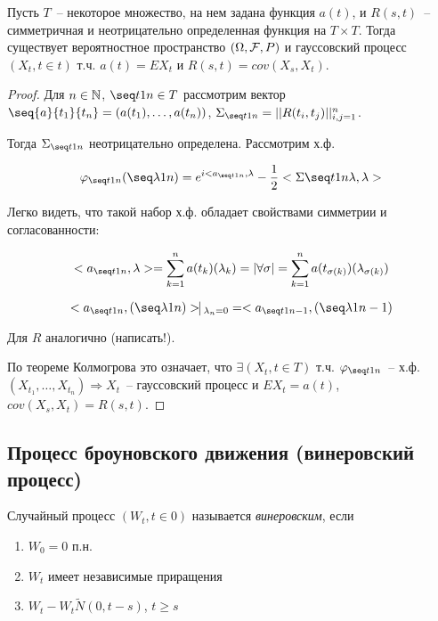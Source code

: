 \begin{theorem}
Пусть $T$~-- некоторое множество, на нем задана функция $a(t)$, и $R(s, t)$~-- симметричная и 
неотрицательно определенная функция на $T \times T$. Тогда существует вероятностное пространство
$(\Omega, \mathcal{F}, P)$ и гауссовский процесс $(X_t, t \in t)$ т.ч. $a(t) = EX_t$ и
$R(s,t) =  cov(X_s, X_t)$.
\end{theorem}
\begin{proof}
Для $n \in \mathbb{N}$, $\seq t 1 n  \in T$  рассмотрим вектор $\seq{a}{t_1}{t_n} =
(a(t_1), \dots, a(t_n))$, $\Sigma_{\seq t 1 n} = ||R(t_i, t_j)||^n_{i,j=1}$.

Тогда $\Sigma_{\seq t 1 n}$ неотрицательно определена. Рассмотрим х.ф.

$$\phi_{\seq t 1 n}(\seq \lambda 1 n) = e^{i<a_{\seq t 1 n}, \lambda} -
\frac12<\Sigma{\seq t 1 n}\lambda, \lambda>$$

Легко видеть, что такой набор х.ф. обладает свойствами симметрии и согласованности:

$$<a_{\seq t 1 n}, \lambda> = \sum_{k=1}^n a(t_k)(\lambda_k) = |\forall \sigma| =
\sum_{k=1}^n a(t_{\sigma(k)})(\lambda_{\sigma(k)})$$

$$<a_{\seq t 1 n}, (\seq \lambda 1 n)> \vline_{\lambda_n = 0} =
<a_{\seq t 1 {n-1}}, (\seq \lambda 1 {n-1})$$

Для $R$ аналогично (написать!).

По теореме Колмогрова это означает, что $\exists (X_t, t \in T)$ т.ч.
$\phi_{\seq t 1 n}$~-- х.ф. $(X_{t_1}, \dots, X_{t_n}) \Rightarrow X_t$~-- гауссовский 
процесс и $EX_t = a(t)$, $cov(X_s, X_t) = R(s,t)$.
\end{proof}

\subsection{Процесс броуновского движения (винеровский процесс)}

\begin{definition}
Случайный процесс $(W_t, t \in 0)$ называется \emph{винеровским}, если
\begin{enumerate}
\item $W_0 = 0$ п.н.
\item $W_t$ имеет независимые приращения
\item $W_t - W_t \tilde N(0, t-s)$, $t \geq s$
\end{enumerate}
\end{definition}

